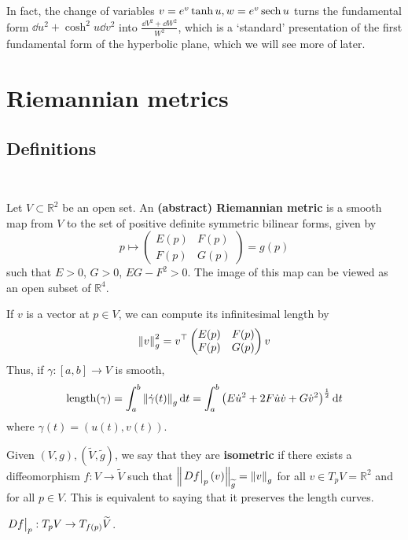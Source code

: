 \documentclass[a4paper]{article}
\begin{document}
In fact, the change of variables \( v = e^v \tanh u, w = e^v \sech u \) turns the fundamental form \( \dd{u}^2 + \cosh^2 u \dd{v}^2 \) into \( \frac{\dd{V}^2 + \dd{W}^2}{W^2} \), which is a `standard' presentation of the first fundamental form of the hyperbolic plane, which we will see more of later.

\section{Riemannian metrics}
\subsection{Definitions}
\ \vspace*{-1.5em}
\begin{definition}
	Let \( V \subset \mathbb R^2 \) be an open set.
	An \textbf{(abstract) Riemannian metric} is a smooth map from \( V \) to the set of positive definite symmetric bilinear forms, given by
	\[
		p \mapsto \begin{pmatrix}
			E(p) & F(p) \\
			F(p) & G(p)
		\end{pmatrix} = g(p)
	\]
	such that \( E > 0 \), \( G > 0 \), \( EG - F^2 > 0 \).
	The image of this map can be viewed as an open subset of \( \mathbb R^4 \).
\end{definition}

If \( v \) is a vector at \( p \in V \), we can compute its infinitesimal length by
\[
	\norm{v}^2_g = v^\top \begin{pmatrix}
		E(p) & F(p) \\
		F(p) & G(p)
	\end{pmatrix} v
\]
Thus, if \( \gamma \colon [a,b] \to V \) is smooth,
\[
	\mathrm{length}(\gamma) = \int_{a}^{b} \norm{\dot{\gamma}(t)}_g \dd{t} = \int_a^b \qty( E \dot u^2 + 2F \dot u \dot v + G \dot v^2 )^{\frac{1}{2}} \dd{t}
\]
where \( \gamma(t) = (u(t),v(t)) \).

\begin{definition}
	Given $ (V,g),(\widetilde{V},\widetilde{g}) $, we say that they are \textbf{isometric} if there exists a diffeomorphism	$f:V\to \widetilde{V}$ such that $ \norm{\eval{D f}_p (v)}_{\widetilde{g}} = \norm{v}_g $ for all $ v\in T_pV = \mathbb{R}^{2} $ and for all $ p\in V $. This is equivalent to saying that it preserves the length curves. 
\end{definition}

\begin{note}
	$ \eval{D f}_p : T_p V \to T_{f(p)}\widetilde{V} $. 
\end{note}
\end{document}
